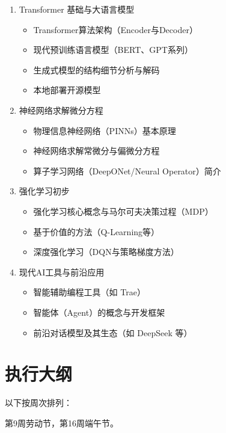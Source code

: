 \documentclass{../nndlcourse}
\begin{document}
\begin{enumerate}
    \item Transformer 基础与大语言模型
    \begin{itemize}
        \item Transformer算法架构（Encoder与Decoder）
        \item 现代预训练语言模型（BERT、GPT系列）
        \item 生成式模型的结构细节分析与解码
        \item 本地部署开源模型
    \end{itemize}
    \item 神经网络求解微分方程
    \begin{itemize}
        \item 物理信息神经网络（PINNs）基本原理
        \item 神经网络求解常微分与偏微分方程
        \item 算子学习网络（DeepONet/Neural Operator）简介
    \end{itemize}
    \item 强化学习初步
    \begin{itemize}
        \item 强化学习核心概念与马尔可夫决策过程（MDP）
        \item 基于价值的方法（Q-Learning等）
        \item 深度强化学习（DQN与策略梯度方法）
    \end{itemize}
        \item 现代AI工具与前沿应用
        \begin{itemize}
            \item 智能辅助编程工具（如 Trae）
            \item 智能体（Agent）的概念与开发框架
            \item 前沿对话模型及其生态（如 DeepSeek 等）
        \end{itemize}
	\end{enumerate}

\section*{执行大纲}

以下按周次排列：

第9周劳动节，第16周端午节。
\end{document}

